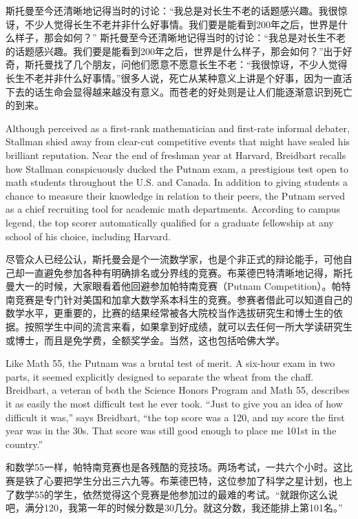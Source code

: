 \ifdefined\chs
\ifdefined\vone
斯托曼至今还清晰地记得当时的讨论：``我总是对长生不老的话题感兴趣。我很惊讶，不少人觉得长生不老并非什么好事情。我们要是能看到200年之后，世界是什么样子，那会如何？''
\fi
\ifdefined\vtwo
斯托曼至今还清晰地记得当时的讨论：``我总是对长生不老的话题感兴趣。我们要是能看到200年之后，世界是什么样子，那会如何？''出于好奇，斯托曼找了几个朋友，问他们愿意不愿意长生不老：``我很惊讶，不少人觉得长生不老并非什么好事情。''很多人说，死亡从某种意义上讲是个好事，因为一直活下去的话生命会显得越来越没有意义。而苍老的好处则是让人们能逐渐意识到死亡的到来。
\fi
\fi

\ifdefined\eng
Although \ifdefined\vtwo perceived as \fi a first-rank mathematician and first-rate \ifdefined\vtwo informal \fi debater, Stallman shied away from clear-cut competitive events that might have sealed his brilliant reputation. Near the end of freshman year at Harvard, Breidbart recalls how Stallman conspicuously ducked the Putnam exam, a prestigious test open to math students throughout the U.S. and Canada. In addition to giving students a chance to measure their knowledge in relation to their peers, the Putnam served as a chief recruiting tool for academic math departments. According to campus legend, the top scorer automatically qualified for a graduate fellowship at any school of his choice, including Harvard.
\fi

\ifdefined\chs
尽管众人已经公认，斯托曼会是个一流数学家，也是个非正式的辩论能手，可他自己却一直避免参加各种有明确排名或分界线的竞赛。布莱德巴特清晰地记得，斯托曼大一的时候，大家眼看着他回避参加帕特南竞赛（Putnam Competition）。帕特南竞赛是专门针对美国和加拿大数学系本科生的竞赛。参赛者借此可以知道自己的数学水平，更重要的，比赛的结果经常被各大院校当作选拔研究生和博士生的依据。按照学生中间的流言来看，如果拿到好成绩，就可以去任何一所大学读研究生或博士，而且是免学费，全额奖学金。当然，这也包括哈佛大学。
\fi

\ifdefined\eng
Like Math 55, the Putnam was a brutal test of merit. A six-hour exam in two parts, it seemed explicitly designed to separate the wheat from the chaff. Breidbart, a veteran of both the Science Honors Program and Math 55, describes it as easily the most difficult test he ever took. ``Just to give you an idea of how difficult it was,'' says Breidbart, ``the top score was a 120, and my score the first year was in the 30s. That score was still good enough to place me 101st in the country.''
\fi

\ifdefined\chs
和数学55一样，帕特南竞赛也是各残酷的竞技场。两场考试，一共六个小时。这比赛是铁了心要把学生分出三六九等。布莱德巴特，这位参加了科学之星计划，也上了数学55的学生，依然觉得这个竞赛是他参加过的最难的考试。``就跟你这么说吧，满分120，我第一年的时候分数是30几分。就这分数，我还能排上第101名。''
\fi

